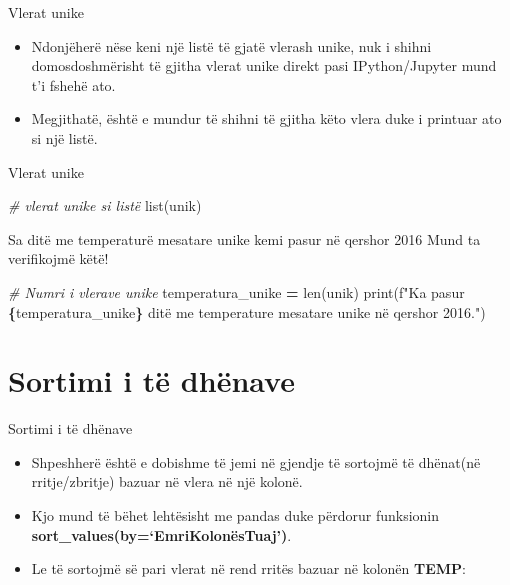 \documentclass[
  ignorenonframetext,
]{beamer}
\newenvironment{Shaded}{\begin{snugshade}}{\end{snugshade}}
\newcommand{\BuiltInTok}[1]{#1}
\newcommand{\CommentTok}[1]{\textcolor[rgb]{0.56,0.35,0.01}{\textit{#1}}}
\newcommand{\NormalTok}[1]{#1}
\newcommand{\OperatorTok}[1]{\textcolor[rgb]{0.81,0.36,0.00}{\textbf{#1}}}
\newcommand{\SpecialCharTok}[1]{\textcolor[rgb]{0.81,0.36,0.00}{\textbf{#1}}}
\newcommand{\SpecialStringTok}[1]{\textcolor[rgb]{0.31,0.60,0.02}{#1}}
\begin{document}
\begin{frame}{Vlerat unike}
\protect\hypertarget{vlerat-unike-3}{}
\begin{itemize}
\item
  Ndonjëherë nëse keni një listë të gjatë vlerash unike, nuk i shihni
  domosdoshmërisht të gjitha vlerat unike direkt pasi IPython/Jupyter
  mund t'i fshehë ato.
\item
  Megjithatë, është e mundur të shihni të gjitha këto vlera duke i
  printuar ato si një listë.
\end{itemize}
\end{frame}

\begin{frame}[fragile]{Vlerat unike}
\protect\hypertarget{vlerat-unike-4}{}
\begin{Shaded}
\begin{Highlighting}[]
\CommentTok{\# vlerat unike si listë}
\BuiltInTok{list}\NormalTok{(unik)}
\end{Highlighting}
\end{Shaded}
\end{frame}

\begin{frame}[fragile]{Sa ditë me temperaturë mesatare unike kemi pasur
në qershor 2016}
\protect\hypertarget{sa-dituxeb-me-temperaturuxeb-mesatare-unike-kemi-pasur-nuxeb-qershor-2016}{}
Mund ta verifikojmë këtë!

\begin{Shaded}
\begin{Highlighting}[]
\CommentTok{\# Numri i vlerave unike}
\NormalTok{temperatura\_unike }\OperatorTok{=} \BuiltInTok{len}\NormalTok{(unik)}
\BuiltInTok{print}\NormalTok{(}\SpecialStringTok{f"Ka pasur }\SpecialCharTok{\{}\NormalTok{temperatura\_unike}\SpecialCharTok{\}}\SpecialStringTok{ ditë me temperature mesatare unike në qershor 2016."}\NormalTok{)}
\end{Highlighting}
\end{Shaded}
\end{frame}

\hypertarget{sortimi-i-tuxeb-dhuxebnave}{%
\section{Sortimi i të dhënave}\label{sortimi-i-tuxeb-dhuxebnave}}

\begin{frame}{Sortimi i të dhënave}
\protect\hypertarget{sortimi-i-tuxeb-dhuxebnave-1}{}
\begin{itemize}
\item
  Shpeshherë është e dobishme të jemi në gjendje të sortojmë të
  dhënat(në rritje/zbritje) bazuar në vlera në një kolonë.
\item
  Kjo mund të bëhet lehtësisht me pandas duke përdorur funksionin
  \textbf{sort\_values(by=`EmriKolonësTuaj')}.
\item
  Le të sortojmë së pari vlerat në rend rritës bazuar në kolonën
  \textbf{TEMP}:
\end{itemize}
\end{frame}
\end{document}
